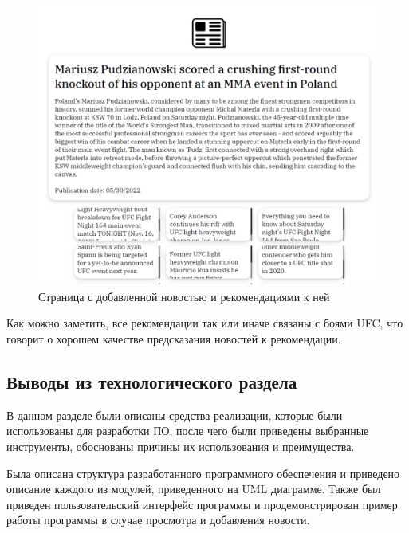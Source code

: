 \begin{figure}[H]
	\centering
	\includegraphics[width=\textwidth]{img/prog_4.pdf}
	\caption{Страница с добавленной новостью и рекомендациями к ней}
	\label{prog_4}
\end{figure}  

Как можно заметить, все рекомендации так или иначе связаны с боями UFC, что говорит о хорошем качестве предсказания новостей к рекомендации.

\subsection{Выводы из технологического раздела}

В данном разделе были описаны средства реализации, которые были использованы для разработки ПО, после чего были приведены выбранные инструменты, обоснованы причины их использования и преимущества.

Была описана структура разработанного программного обеспечения и приведено описание каждого из модулей, приведенного на UML диаграмме. Также был приведен пользовательский интерфейс программы и продемонстрирован пример работы программы в случае просмотра и добавления новости.

\pagebreak